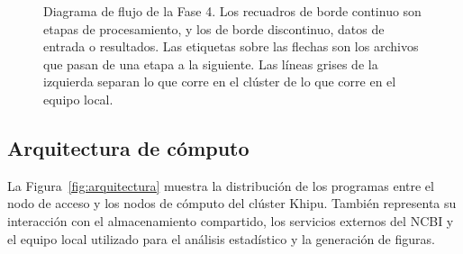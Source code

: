 \begin{nuevo}
\begin{figure}[htbp]
\caption[Diagrama de flujo de la Fase 4]{Diagrama de flujo de la Fase 4. Los
recuadros de borde continuo son etapas de procesamiento, y los de borde
discontinuo, datos de entrada o resultados. Las etiquetas sobre las flechas son
los archivos que pasan de una etapa a la siguiente. Las líneas grises de la
izquierda separan lo que corre en el clúster de lo que corre en el equipo
local.}
\label{fig:pfd_f4}
\end{figure}
\end{nuevo}

\subsection{Arquitectura de cómputo}

La Figura~\ref{fig:arquitectura} muestra la distribución de los programas entre el 
nodo de acceso y los nodos de cómputo del clúster Khipu. También representa su interacción 
con el almacenamiento compartido, los servicios externos del NCBI y el equipo local utilizado 
para el análisis estadístico y la generación de figuras.

